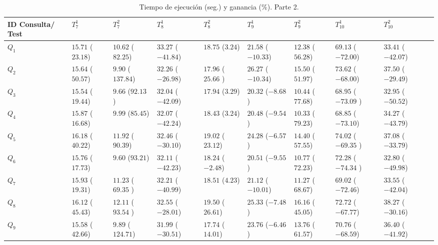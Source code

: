 \documentclass[a4paper,final,11pt,fleqn,twoside]{book}  %
\begin{document}
\begin{table}
\renewcommand{\arraystretch}{1.3}
\begin{center}
\begin{tabular}{|p{1.5cm}|p{1.5cm}|p{1.5cm}|p{1.5cm}|p{1.5cm}|p{1.5cm}|p{1.5cm}|p{1.5cm}|p{1.5cm}|p{1.5cm}|}
\hline
\textbf{ID Consulta/ Test} & $T^{1}_{7}$ & $T^{2}_{7}$ & $T^{1}_{8}$ & $T^{2}_{8}$ & $T^{1}_{9}$ & $T^{2}_{9}$ & $T^{1}_{10}$ & $T^{2}_{10}$\\ \hline
  $Q_1$ & $15.71$ ($23.18$)  & $10.62$ ($82.25$) & $33.27$ ($-41.84$) & $18.75$ ($3.24$) & $21.58$ ($-10.33$) & $12.38$ ($56.28$) & $69.13$ ($-72.00$) & $33.41$ ($-42.07$) \\ \hline
  $Q_2$ & $15.64$ ($50.57$)  & $9.90$ ($137.84$) & $32.26$ ($-26.98$) & $17.96$ ($25.66$ ) & $26.27$ ($-10.34$) & $15.50$ ($51.97$) & $73.62$ ($-68.00$) & $37.50$ ($-29.49$) \\ \hline
  $Q_3$ & $15.54$ ($19.44$)  & $9.66$ ($92.13$ ) & $32.04$ ($-42.09$) & $17.94$ ($3.29$) & $20.32$ ($-8.68$) & $10.44$ ($77.68$) & $68.95$ ($-73.09$ ) & $32.95$ ($-50.52$) \\ \hline
  $Q_4$ & $15.87$ ($16.68$)  & $9.99$ ($85.45$) & $32.07$ ($-42.24$) & $18.43$ ($3.24$) & $20.48$ ($-9.54$) & $10.33$ ($79.23$) & $68.85$ ($-73.10$) & $34.27$ ($-43.79$) \\ \hline
  $Q_5$ & $16.18$ ($40.22$)  & $11.92$ ($90.39$) & $32.46$ ($-30.10$) & $19.02$ ($23.12$) & $24.28$ ($-6.57$) & $14.40$ ($57.55$) & $74.02$ ($-69.35$ ) & $37.08$ ($-33.79$) \\ \hline
  $Q_6$ & $15.76$ ($17.73$)  & $9.60$ ($93.21$) & $32.11$ ($-42.23$) & $18.24$ ($-2.48$) & $20.51$ ($-9.55$) & $10.77$ ($72.23$) & $72.28$ ($-74.34$ ) & $32.80$ ($-49.98$) \\ \hline
  $Q_7$ & $15.93$ ($19.31$)  & $11.23$ ($69.35$ ) & $32.21$ ($-40.99$) & $18.51$ ($4.23$) & $21.12$ ($-10.01$) & $11.27$ ($68.67$) & $69.02$ ($-72.46$) & $33.55$ ($-42.04$) \\ \hline
  $Q_8$ & $16.12$ ($45.43$)  & $12.11$ ($93.54$ ) & $32.55$ ($-28.01$) & $19.50$ ($26.61$) & $25.33$ ($-7.48$) & $16.16$ ($45.05$) & $72.72$ ($-67.77$) & $38.27$ ($-30.16$) \\ \hline
  $Q_9$ & $15.58$ ($42.66$)  & $9.89$ ($124.71$) & $31.99$ ($-30.51$) & $17.74$ ($14.01$) & $23.76$ ($-6.46$) & $13.76$ ($61.57$) & $70.76$ ($-68.59$) & $36.40$ ($-41.92$) \\ \hline
  \hline
  \end{tabular}
  \caption{Tiempo de ejecución (seg.) y ganancia (\%). Parte 2.}
  \label{tabla:results-2}
  \end{center}
\end{table} 
\end{document}
